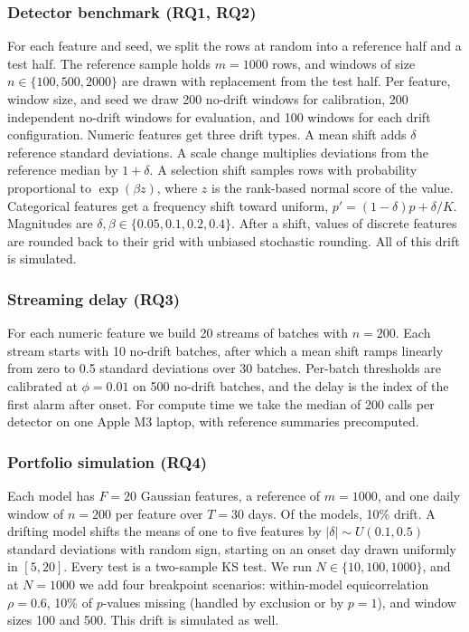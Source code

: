\documentclass[journal]{IEEEtran}
\begin{document}
\subsubsection{Detector benchmark (RQ1, RQ2)}
For each feature and seed, we split the rows at random into a reference half and a test half. The reference sample holds $m=1000$ rows, and windows of size $n\in\{100,500,2000\}$ are drawn with replacement from the test half. Per feature, window size, and seed we draw 200 no-drift windows for calibration, 200 independent no-drift windows for evaluation, and 100 windows for each drift configuration. Numeric features get three drift types. A mean shift adds $\delta$ reference standard deviations. A scale change multiplies deviations from the reference median by $1+\delta$. A selection shift samples rows with probability proportional to $\exp(\beta z)$, where $z$ is the rank-based normal score of the value. Categorical features get a frequency shift toward uniform, $p'=(1-\delta)p+\delta/K$. Magnitudes are $\delta,\beta\in\{0.05,0.1,0.2,0.4\}$. After a shift, values of discrete features are rounded back to their grid with unbiased stochastic rounding. All of this drift is simulated.

\subsubsection{Streaming delay (RQ3)}
For each numeric feature we build 20 streams of batches with $n=200$. Each stream starts with 10 no-drift batches, after which a mean shift ramps linearly from zero to 0.5 standard deviations over 30 batches. Per-batch thresholds are calibrated at $\phi=0.01$ on 500 no-drift batches, and the delay is the index of the first alarm after onset. For compute time we take the median of 200 calls per detector on one Apple M3 laptop, with reference summaries precomputed.

\subsubsection{Portfolio simulation (RQ4)}
Each model has $F=20$ Gaussian features, a reference of $m=1000$, and one daily window of $n=200$ per feature over $T=30$ days. Of the models, 10\% drift. A drifting model shifts the means of one to five features by $|\delta|\sim U(0.1,0.5)$ standard deviations with random sign, starting on an onset day drawn uniformly in $[5,20]$. Every test is a two-sample KS test. We run $N\in\{10,100,1000\}$, and at $N=1000$ we add four breakpoint scenarios: within-model equicorrelation $\rho=0.6$, 10\% of $p$-values missing (handled by exclusion or by $p=1$), and window sizes 100 and 500. This drift is simulated as well.
\end{document}
